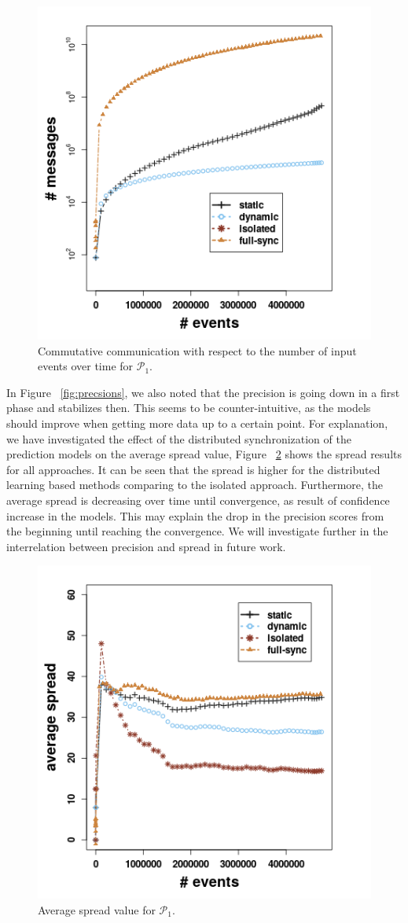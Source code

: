 \begin{center}
	
	\begin{figure}[h]
		
		\includegraphics[width=.5\textwidth]{figures/messages_p1.png}
		
		\caption{Commutative communication with respect to the number of input events over time for $\mathcal{P}_1$.}
		\label{fig:comm}
	\end{figure}
\end{center}


In Figure ~\ref{fig:precsions}, we also noted that the precision is going down in a first phase and stabilizes then.  This seems to be counter-intuitive, as the models should improve when getting more data up to a certain point. For explanation, we have investigated the effect of the distributed synchronization of the prediction models on the average spread value, Figure  ~\ref{fig:spread}  shows the spread results for all approaches. It can be seen that the spread is higher for the distributed learning based methods comparing to the isolated approach. Furthermore, the average spread is decreasing over time until convergence, as result of confidence increase in the models. This may explain the drop in the precision scores from the beginning until reaching the convergence. We will investigate further in the interrelation between precision and spread in future work. 

\begin{center}
	
	\begin{figure}[ht]
		
		\includegraphics[width=.5\textwidth]{figures/spread_p1.png}
		
		\caption{Average spread value for $\mathcal{P}_1$.}
		\label{fig:spread}
	\end{figure}
\end{center}


